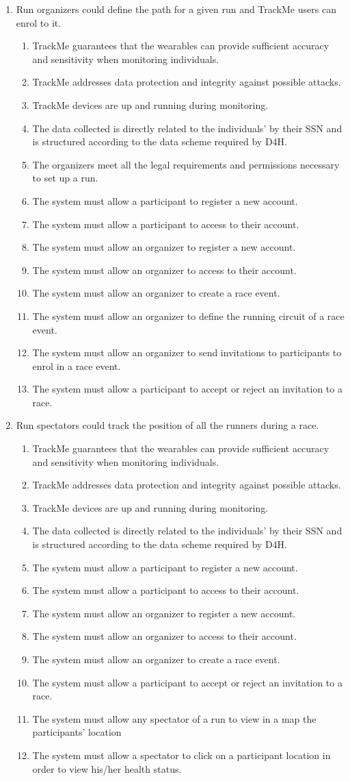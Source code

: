 \documentclass[hidelinks, 12pt]{report}
\newcommand\requirement[1]{\item[{[R#1]}] }
\newcommand\goal[1]{\item[{[G#1]}] }
\newcommand\assumption[1]{\item[{[D#1]}] }
\begin{document}
\begin{enumerate}
		\goal{6} Run organizers could define the path for a given run and TrackMe users can enrol to it.
		\begin{enumerate}
			\assumption{1} TrackMe guarantees that the wearables can provide sufficient accuracy and sensitivity when monitoring individuals.
			\assumption{2} TrackMe addresses data protection and integrity against possible attacks.
			\assumption{3} TrackMe devices are up and running during monitoring.
			\assumption{4} The data collected is directly related to the individuals' by their SSN and is structured according to the data scheme required by D4H.
			\assumption{7} The organizers meet all the legal requirements and permissions necessary to set up a run.
			\requirement{16} The system must allow a participant to register a new account.
			\requirement{17} The system must allow a participant to access to their account.
			\requirement{18} The system must allow an organizer to register a new account.
			\requirement{19} The system must allow an organizer to access to their account.
			\requirement{20} The system must allow an organizer to create a race event.
			\requirement{21} The system must allow an organizer to define the running circuit of a race event.
			\requirement{22} The system must allow an organizer to send invitations to participants to enrol in a race event.
			\requirement{23} The system must allow a participant to accept or reject an invitation to a race.
		\end{enumerate}
		
		\goal{7} Run spectators could track the position of all the runners during a race.
		\begin{enumerate}
			\assumption{1} TrackMe guarantees that the wearables can provide sufficient accuracy and sensitivity when monitoring individuals.
			\assumption{2} TrackMe addresses data protection and integrity against possible attacks.
			\assumption{3} TrackMe devices are up and running during monitoring.
			\assumption{4} The data collected is directly related to the individuals' by their SSN and is structured according to the data scheme required by D4H.
			\requirement{16} The system must allow a participant to register a new account.
			\requirement{17} The system must allow a participant to access to their account.
			\requirement{18} The system must allow an organizer to register a new account.
			\requirement{19} The system must allow an organizer to access to their account.
			\requirement{20} The system must allow an organizer to create a race event.
			\requirement{23} The system must allow a participant to accept or reject an invitation to a race.
			\requirement{24} The system must allow any spectator of a run to view in a map the participants' location
			\requirement{25} The system must allow a spectator to click on a participant location in order to view his/her health status.
		\end{enumerate}
		
	\end{enumerate}
	
\end{document}
